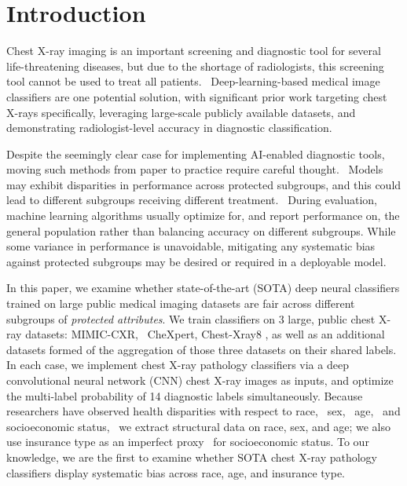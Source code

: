 \documentclass{ws-procs11x85}
\begin{document}
\section{Introduction}
Chest X-ray imaging is an important screening and diagnostic tool for several life-threatening diseases, but due to the shortage of radiologists, this screening tool cannot be used to treat all patients.~\cite{rimmer_radiologist_2017, shortage2015}
Deep-learning-based medical image classifiers are one potential solution, with significant prior work targeting chest X-rays specifically,\cite{wang_chestx-ray8:_2017,yao_learning_2017} leveraging large-scale publicly available datasets,\cite{wang_chestx-ray8:_2017, johnson_mimic-cxr:_2019, irvin_chexpert:_2019} and demonstrating radiologist-level accuracy in diagnostic classification.\cite{rajpurkar_chexnet:_2017, rajpurkar_deep_2018, irvin_chexpert:_2019}

Despite the seemingly clear case for implementing AI-enabled diagnostic tools,~\cite{vect} moving such methods from paper to practice require careful thought.~\cite{ghassemi2019practical}  Models may exhibit disparities in performance across protected subgroups, and this
could lead to different subgroups receiving different treatment.~\cite{chen2019can} During evaluation, machine learning algorithms usually optimize for, and report performance on, the general population rather than balancing accuracy on different subgroups. While some variance in performance is unavoidable, mitigating any systematic bias against protected subgroups may be desired or required in a deployable model. 

In this paper, we examine whether state-of-the-art (SOTA) deep neural classifiers trained on large public medical imaging datasets are fair across different subgroups of \textit{protected attributes}. We train classifiers on 3 large, public chest X-ray datasets: MIMIC-CXR,~\cite{johnson_mimic-cxr:_2019} CheXpert,\cite{irvin_chexpert:_2019} Chest-Xray8 \cite{wang_chestx-ray8:_2017}, as well as an additional datasets formed of the aggregation of those three datasets on their shared labels. In each case, we implement chest X-ray pathology classifiers via a deep convolutional neural network (CNN) chest X-ray images as inputs, and optimize the multi-label probability of 14 diagnostic labels simultaneously.
Because researchers have observed health disparities with respect to race,~\cite{kawachi2005health} sex,~\cite{hoffmann2001girl} age,~\cite{walter2019age} and socioeconomic status,~\cite{kawachi2005health} we extract structural data on race, sex, and age; we also use insurance type as an imperfect proxy~\cite{chen2019can} for socioeconomic status. To our knowledge, we are the first to examine whether SOTA chest X-ray pathology classifiers display systematic bias across race, age, and insurance type. 
\end{document}
